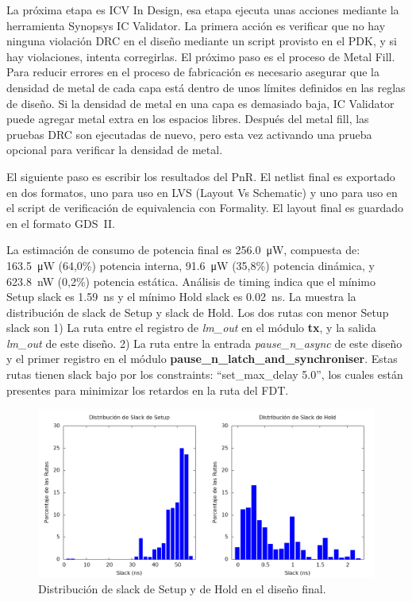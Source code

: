 \documentclass[a4paper, twoside, 11pt]{report}
\begin{document}
La próxima etapa es ICV In Design, esa etapa ejecuta unas acciones mediante la herramienta Synopsys IC Validator. La primera acción es verificar que no hay ninguna violación DRC en el diseño mediante un script provisto en el PDK, y si hay violaciones, intenta corregirlas. El próximo paso es el proceso de Metal Fill. Para reducir errores en el proceso de fabricación es necesario asegurar que la densidad de metal de cada capa está dentro de unos límites definidos en las reglas de diseño. Si la densidad de metal en una capa es demasiado baja, IC Validator puede agregar metal extra en los espacios libres. Después del metal fill, las pruebas DRC son ejecutadas de nuevo, pero esta vez activando una prueba opcional para verificar la densidad de metal.

El siguiente paso es escribir los resultados del PnR. El netlist final es exportado en dos formatos, uno para uso en LVS (Layout Vs Schematic) y uno para uso en el script de verificación de equivalencia con Formality. El layout final es guardado en el formato GDS~II.

La estimación de consumo de potencia final es \SI{256.0}{\micro\watt}, compuesta de: \SI{163.5}{\micro\watt} (64,0\%) potencia interna, \SI{91.6}{\micro\watt} (35,8\%) potencia dinámica, y \SI{623.8}{\nano\watt} (0,2\%) potencia estática. Análisis de timing indica que el mínimo Setup slack es \SI{1,59}{\nano\second} y el mínimo Hold slack es \SI{0.02}{\nano\second}. La  muestra la distribución de slack de Setup y slack de Hold. Los dos rutas con menor Setup slack son 1) La ruta entre el registro de \textit{lm\_out} en el módulo \textbf{tx}, y la salida \textit{lm\_out} de este diseño. 2) La ruta entre la entrada \textit{pause\_n\_async} de este diseño y el primer registro en el módulo \textbf{pause\_n\_latch\_and\_synchroniser}. Estas rutas tienen slack bajo por los constraints: “set\_max\_delay 5.0”, los cuales están presentes para minimizar los retardos en la ruta del FDT.

\begin{figure}[htb]
  \centering
  \includegraphics[width=1.0\textwidth]{./img/slack}
  \caption{Distribución de slack de Setup y de Hold en el diseño final.}
  \label{fig:setup_hold_slack}
\end{figure}
\end{document}
